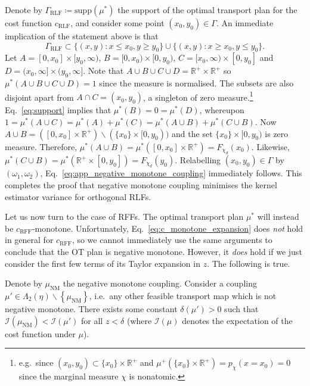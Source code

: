 Denote by $\Gamma_\textrm{RLF} \coloneqq \textrm{supp}(\mu^*)$ the support of the optimal transport plan for the cost function $c_\textrm{RLF}$, and consider some point $(x_0,y_0) \in \Gamma$.
An immediate implication of the statement above is that  
\begin{equation} \label{eq:support}
    \Gamma_\textrm{RLF} \subset \{(x,y): x \leq x_0, y \geq y_0 \} \cup \{(x,y): x \geq x_0, y \leq y_0 \}.
\end{equation}
Let $A = [0,x_0] \times [y_0,\infty)$, $B = [0,x_0) \times [0,y_0)$, $C = [x_0,\infty) \times [0,y_0]$ and $D = (x_0,\infty] \times (y_0, \infty]$. 
Note that $A \cup B \cup C \cup D = \mathbb{R}^+ \times \mathbb{R}^+$ so $\mu^*(A \cup B \cup C \cup D)=1$ since the measure is normalised. 
The subsets are also disjoint apart from $A \cap C = (x_0,y_0)$, a singleton of zero measure.\footnote{e.g.~since $(x_0,y_0) \subset \{x_0\} \times \mathbb{R}^+$ and $\mu^+(\{x_0\} \times \mathbb{R}^+)= p_\chi(x=x_0) = 0$ since the marginal measure $\chi$ is nonatomic.} 
Eq.~\ref{eq:support} implies that $\mu^*(B) = 0 = \mu^*(D)$, whereupon $1 = \mu^*(A \cup C) = \mu^*(A) + \mu^*(C) = \mu^*(A \cup B) + \mu^*(C \cup B)$. Now $ A \cup B = ( [0,x_0] \times \mathbb{R}^+ ) \backslash ( \{x_0 \} \times [0,y_0) )$ and the set $ \{x_0 \} \times [0,y_0) $ is zero measure.
Therefore, $\mu^* (A \cup B) = \mu^* ( [0,x_0] \times \mathbb{R}^+ ) = F_{\chi_d}(x_0)$. Likewise, $\mu^* (C \cup B) = \mu^* ( \mathbb{R}^+ \times [0,y_0] ) = F_{\chi_d}(y_0)$. Relabelling $(x_0,y_0) \in \Gamma$ by $(\omega_1,\omega_2)$, Eq.~\ref{eq:app_negative_monotone_coupling} immediately follows.
This completes the proof that negative monotone coupling minimises the kernel estimator variance for orthogonal RLFs. 

Let us now turn to the case of RFFs. 
The optimal transport plan $\mu^*$ will instead be $c_\textrm{RFF}$-monotone.
Unfortunately, Eq.~\ref{eq:c_monotone_expansion} does \emph{not} hold in general for $c_\textrm{RFF}$, so we cannot immediately use the same arguments to conclude that the OT plan is negative monotone.
However, it \emph{does} hold if we just consider the first few terms of its Taylor expansion in $z$.
The following is true.


\begin{lemma} \label{thm:app_z_small_enough}
    Denote by $\mu_\textrm{NM}$ the negative monotone coupling. 
    Consider a coupling $\mu' \in \Lambda_2(\eta) \backslash \left \{ \mu_\textrm{NM} \right \}$, i.e.~any other feasible transport map which is not negative monotone.
    There exists some constant $\delta(\mu')>0$ such that $\mathcal{I}(\mu_\textrm{NM}) < \mathcal{I}(\mu')$ for all $z < \delta$ (where $\mathcal{I}(\mu)$ denotes the expectation of the cost function under $\mu$).
\end{lemma}

